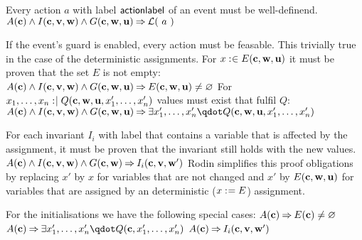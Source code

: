 Every action $a$ with label $\textsf{actionlabel}$ of an event must be well-definend.
  {}%
  {$A(\allconstants) \land I(\allconstants,\allvariables) \land G(\allconstants,\concvariables,\concparameters) \limp %
    \wdl(~a~)$}
  

If the event's guard is enabled, every action must be feasable.
  This trivially true in the case of the deterministic assignments.
  For $x \mathrel{:\mkern1mu\in} E(\textbf{c},\textbf{w},\textbf{u})$ it must be proven that the
  set $E$ is not empty:
  {$A(\allconstants) \land I(\allconstants,\allvariables) \land G(\allconstants,\concvariables,\concparameters) \limp %
    E(\allconstants,\concvariables,\concparameters) \neq \emptyset$}
  For $x_1,\ldots,x_n \mathrel{:\mkern1mu\mid} Q(\textbf{c},\textbf{w},\textbf{u},x_1',\ldots,x_n')$
  values must exist that fulfil $Q$:
  {$A(\allconstants) \land I(\allconstants,\allvariables) \land G(\allconstants,\concvariables,\concparameters) \limp %
    \exists x_1',\ldots,x_n' \qdot Q(\allconstants,\concvariables,\concparameters,x_1',\ldots,x_n')$}  

For each invariant $I_i$ with label  
  that contains a variable that is affected by the assignment, it must be proven
  that the invariant still holds with the new values.
  {}%
  {$A(\textbf{c}) \land I(\textbf{c},{\textbf{v},\textbf{w}}) \land G(\textbf{c},\textbf{w}) \mathbin\Rightarrow I_i(\textbf{c},{\textbf{v},\textbf{w}}')$}
  Rodin simplifies this proof obligations by replacing $x'$ by $x$ for variables that are not
  changed and $x'$ by $E(\textbf{c},\textbf{w},\textbf{u})$ 
  for variables that are assigned by an deterministic ($x \mathrel{:\mkern1mu=} E$) assignment.

For the initialisations we have the following special cases:
  {$A(\textbf{c}) \mathbin\Rightarrow  E(\textbf{c}) \neq \mathord\varnothing$}
  {$A(\allconstants) \limp \exists x_1',\ldots,x_n' \qdot Q(\allconstants,x_1',\ldots,x_n')$}  
  {}%
  {$A(\textbf{c}) \mathbin\Rightarrow I_i(\textbf{c},{\textbf{v},\textbf{w}}')$}

